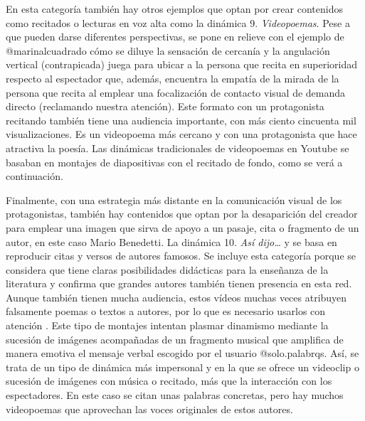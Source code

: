 En esta categoría también hay otros ejemplos que optan por crear
contenidos como recitados o lecturas en voz alta como la dinámica 9.
\emph{Videopoemas}. Pese a que pueden darse diferentes perspectivas, se
pone en relieve con el ejemplo de @marinalcuadrado cómo se diluye la
sensación de cercanía y la angulación vertical (contrapicada) juega para
ubicar a la persona que recita en superioridad respecto al espectador
que, además, encuentra la empatía de la mirada de la persona que recita
al emplear una focalización de contacto visual de demanda directo
(reclamando nuestra atención). Este formato con un protagonista
recitando también tiene una audiencia importante, con más ciento
cincuenta mil visualizaciones. Es un videopoema más cercano y con una
protagonista que hace atractiva la poesía. Las dinámicas tradicionales
de videopoemas en Youtube se basaban en montajes de diapositivas con el
recitado de fondo, como se verá a continuación.

Finalmente, con una estrategia más distante en la comunicación visual de
los protagonistas, también hay contenidos que optan por la desaparición
del creador para emplear una imagen que sirva de apoyo a un pasaje, cita
o fragmento de un autor, en este caso Mario Benedetti. La dinámica 10.
\emph{Así dijo\ldots{}} y se basa en reproducir citas y versos de
autores famosos. Se incluye esta categoría porque se considera que tiene
claras posibilidades didácticas para la enseñanza de la literatura y
confirma que grandes autores también tienen presencia en esta red.
Aunque también tienen mucha audiencia, estos vídeos muchas veces
atribuyen falsamente poemas o textos a autores, por lo que es necesario
usarlos con atención \cite{roviracollado-hernandez-ortega-2023}. Este tipo
de montajes intentan plasmar dinamismo mediante la sucesión de imágenes
acompañadas de un fragmento musical que amplifica de manera emotiva el
mensaje verbal escogido por el usuario @solo.palabrqs. Así, se trata de
un tipo de dinámica más impersonal y en la que se ofrece un videoclip o
sucesión de imágenes con música o recitado, más que la interacción con
los espectadores. En este caso se citan unas palabras concretas, pero
hay muchos videopoemas que aprovechan las voces originales de estos
autores.

